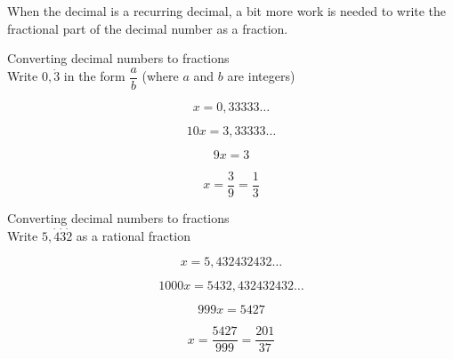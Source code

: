       \label{m38348*id63993}When the decimal is a recurring decimal, a bit more work is needed to write the fractional part of the decimal number as a fraction.\par 
      
\begin{wex}
{%
Converting decimal numbers to fractions
}
{%
\\
Write $0,\dot{3}$ in the form $\dfrac{a}{b}$ (where $a$ and $b$ are integers)
}
{%

\westep{}
$$x = 0,33333\ldots$$



$$10x = 3,33333\ldots$$



$$9x = 3 $$


$$ x = \dfrac{3}{9} = \dfrac{1}{3} $$
}
\end{wex}


\begin{wex}
{%
Converting decimal numbers to fractions
}
{%
\\Write $5,\dot{4}\dot{3}\dot{2}$ as a rational fraction
}
{%

\westep{}

$$ x = 5,432432432\ldots $$


$$ 1000x = 5432,432432432\ldots $$


$$ 999x = 5427 $$


$$ x = \dfrac{5427}{999} = \dfrac{201}{37} $$
 
}
\end{wex}






